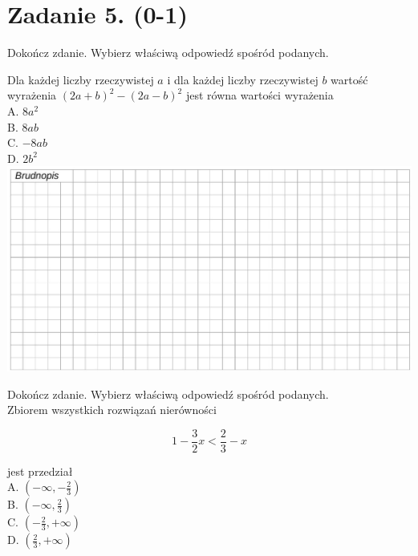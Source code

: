 \documentclass[10pt]{article}
\begin{document}
\section*{Zadanie 5. (0-1)}
Dokończ zdanie. Wybierz właściwą odpowiedź spośród podanych.

Dla każdej liczby rzeczywistej \(a\) i dla każdej liczby rzeczywistej \(b\) wartość wyrażenia \((2 a+b)^{2}-(2 a-b)^{2}\) jest równa wartości wyrażenia\\
A. \(8 a^{2}\)\\
B. \(8 a b\)\\
C. \(-8 a b\)\\
D. \(2 b^{2}\)\\
\includegraphics[max width=\textwidth, center]{2024_11_21_daeb5e5efb43dd4cb535g-06}

Dokończ zdanie. Wybierz właściwą odpowiedź spośród podanych.\\
Zbiorem wszystkich rozwiązań nierówności

\[
1-\frac{3}{2} x<\frac{2}{3}-x
\]

jest przedział\\
A. \(\left(-\infty,-\frac{2}{3}\right)\)\\
B. \(\left(-\infty, \frac{2}{3}\right)\)\\
C. \(\left(-\frac{2}{3},+\infty\right)\)\\
D. \(\left(\frac{2}{3},+\infty\right)\)
\end{document}
